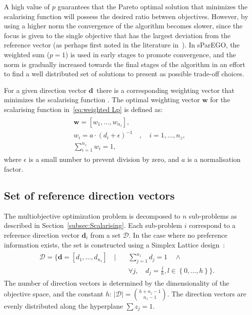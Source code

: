 \documentclass[10pt]{llncs}
\newcommand{\brs}[1]{\left[{#1}\right]} %
\newcommand{\brr}[1]{{\left({#1}\right)}} %
\newcommand{\brf}[1]{\left\lbrace{#1}\right\rbrace} %
\newcommand{\vd}{\ensuremath{\mathbf{d}}} %
\newcommand{\DSet}{\ensuremath{\mathcal{D}}} %
\begin{document}
A high value of $p$ guarantees that the Pareto optimal solution that minimizes the scalarising function will possess the desired ratio between objectives. However, by using a higher norm the convergence of the algorithm becomes slower, since the focus is given to the single objective that has the largest deviation from the reference vector (as perhaps first noted in the literature in~\cite{borges1998basis}). In sParEGO, the weighted sum ($p=1$) is used in early stages to promote convergence, and the norm is gradually increased towards the final stages of the algorithm in an effort to find a well distributed set of solutions to present as possible trade-off choices.

For a given direction vector \vd\ there is a corresponding weighting vector that minimizes the scalarising function \cite{giagkiozis2014generalized}. The optimal weighting vector $\mathbf{w}$ for the scalarising function in~\eqref{eq:weighted Lp} is defined as:
\begin{align}
\begin{split}
	&\mathbf{w}=\brs{w_1,\ldots,w_{n_z}},\\
	&w_i=a\cdot\brr{d_i+\epsilon}^{-1} \quad , \quad i=1,\ldots,n_z,\\
	&\sum_{i=1}^{n_z} w_i=1,
\end{split}
\end{align}
where $\epsilon$ is a small number to prevent division by zero, and $a$ is a normalisation factor.

\subsection{Set of reference direction vectors}
\label{sec:Simplex Lattice}
The multiobjective optimization problem is decomposed to $n$ sub-problems as described in Section~\ref{subsec:Scalarising}. Each sub-problem $i$ correspond to a reference direction vector $\vd_i$ from a set $\DSet$. In the case where no preference information exists, the set is constructed using a Simplex Lattice design~\cite{Scheffe1958Experiments}:
\begin{align}
	\label{eq:SimplexLattice}
	\begin{split}
		\DSet = \Biggl\lbrace\vd=\brs{d_1,\ldots,d_{n_z}}\quad \vert \quad &\sum_{j=1}^{n_z} d_j = 1 \quad \wedge \\
		& \forall j, \quad d_j = \frac{l}{h}, l\in\brf{0,\ldots,h} \Biggr\rbrace.
	\end{split}
\end{align}
The number of direction vectors is determined by the dimensionality of the objective space, and the constant $h$: $\vert\DSet\vert = \binom{h+n_z-1}{n_z-1}$. The direction vectors are evenly distributed along the hyperplane $\sum z_j = 1$.
\end{document}
